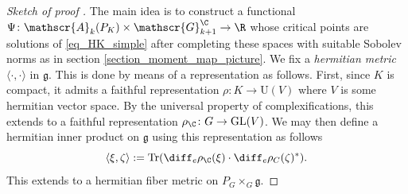 \begin{proof}[\textit{Sketch of proof } \parencite{i1999hitchin}]
    The main idea is to construct a functional \(\Psi\colon \mathscr{A}_k(P_K) \times \mathscr{G}_{k+1}^\C \to \R\) whose critical points are solutions of \eqref{eq_HK_simple} after completing these spaces with suitable Sobolev norms as in section \ref{section_moment_map_picture}. We fix a \textit{hermitian metric} \(\langle \cdot, \cdot \rangle\) in \(\mathfrak{g}\). This is done by means of a representation as follows. First, since \(K\) is compact, it admits a faithful representation \(\rho\colon K \to \mathrm{U}(V)\) where \(V\) is some hermitian vector space. By the universal property of complexifications, this extends to a faithful representation \(\rho_\C\colon G \to \mathrm{GL}(V)\). We may then define a hermitian inner product on \(\mathfrak{g}\) using this representation as follows
    \[
    \langle \xi, \zeta \rangle:=\mathrm{Tr}(\diff_e\rho_\C(\xi)\cdot \diff_e\rho_C(\zeta)^*).
    \]
    This extends to a hermitian fiber metric on \(P_G \times_G \mathfrak{g}\). 


\end{proof}
